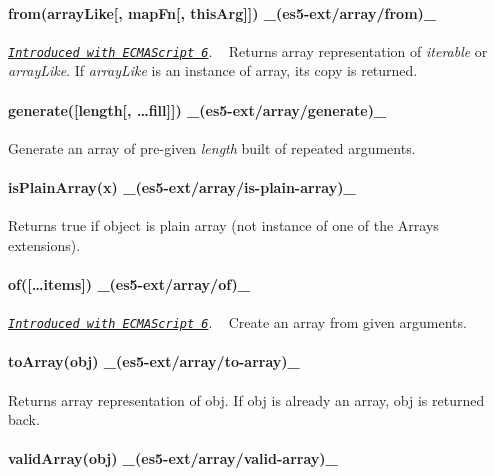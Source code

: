 \paragraph*{from(array\+Like\mbox{[}, map\+Fn\mbox{[}, this\+Arg\mbox{]}\mbox{]}) \+\_\+(es5-\/ext/array/from)\+\_\+}

\href{http://people.mozilla.org/~jorendorff/es6-draft.html#sec-array.from}{\tt {\itshape Introduced with E\+C\+M\+A\+Script 6}}. ~\newline
Returns array representation of {\itshape iterable} or {\itshape array\+Like}. If {\itshape array\+Like} is an instance of array, its copy is returned.

\paragraph*{generate(\mbox{[}length\mbox{[}, …fill\mbox{]}\mbox{]}) \+\_\+(es5-\/ext/array/generate)\+\_\+}

Generate an array of pre-\/given {\itshape length} built of repeated arguments.

\paragraph*{is\+Plain\+Array(x) \+\_\+(es5-\/ext/array/is-\/plain-\/array)\+\_\+}

Returns true if object is plain array (not instance of one of the Array\textquotesingle{}s extensions).

\paragraph*{of(\mbox{[}…items\mbox{]}) \+\_\+(es5-\/ext/array/of)\+\_\+}

\href{http://people.mozilla.org/~jorendorff/es6-draft.html#sec-array.of}{\tt {\itshape Introduced with E\+C\+M\+A\+Script 6}}. ~\newline
Create an array from given arguments.

\paragraph*{to\+Array(obj) \+\_\+(es5-\/ext/array/to-\/array)\+\_\+}

Returns array representation of {\ttfamily obj}. If {\ttfamily obj} is already an array, {\ttfamily obj} is returned back.

\paragraph*{valid\+Array(obj) \+\_\+(es5-\/ext/array/valid-\/array)\+\_\+}

